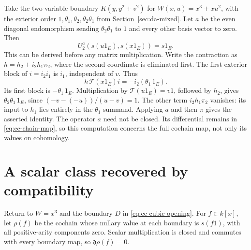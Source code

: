 \begin{example}
\label{ex:cc-binary}
Take the two-variable boundary \(K(y,y^2+v^2)\) for
\(W(x,u)=x^3+xu^2\), with the exterior order
\(1,\theta_1,\theta_2,\theta_2\theta_1\) from
Section~\ref{sec:da-mixed}. Let \(a\) be the even diagonal
endomorphism sending \(\theta_2\theta_1\) to \(1\) and every
other basis vector to zero. Then
\[
 U^a_2(s(u1_E),s(x1_E))=s1_E .
\]
This can be derived before any matrix multiplication.
Write the contraction as \(h=h_2+i_2h_1\pi_2\), where the
second coordinate is eliminated first.
The first exterior block of \(i=i_2i_1\) is \(i_1\), independent
of \(v\). Thus
\[
 h\,\mathcal T(x1_E)i=-i_2(\theta_1\,1_E).
\]
Its first block is \(-\theta_1\,1_E\). Multiplication by
\(\mathcal T(u1_E)=v1\), followed by \(h_2\), gives
\(\theta_2\theta_1\,1_E\), since
\(({-v}-({-u}))/(u-v)=1\).
The other term \(i_2h_1\pi_2\) vanishes: its input to \(h_1\)
lies entirely in the \(\theta_1\)-summand.
Applying \(a\) and then \(\pi\) gives the asserted identity.
The operator \(a\) need not be closed. Its differential remains
in \eqref{eq:cc-chain-map}, so this computation concerns the
full cochain map, not only its values on cohomology.
\end{example}

\section{A scalar class recovered by compatibility}
\label{sec:cc-cubic}

Return to \(W=x^3\) and the boundary \(D\) in
\eqref{eq:cc-cubic-opening}. For \(f\in k[x]\), let
\(\rho(f)\) be the cochain whose nullary value at each boundary
is \(s(f1)\), with all positive-arity components zero.
Scalar multiplication is closed and commutes with every
boundary map, so \(\mathfrak d\rho(f)=0\).


